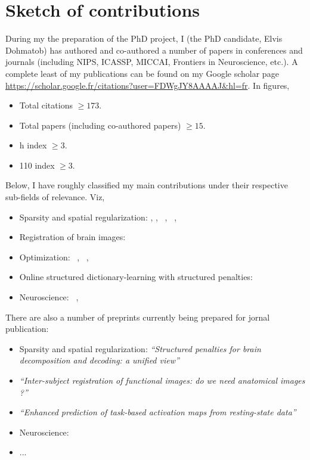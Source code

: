 \section{Sketch of contributions}
\label{sec:contrib}
During my the preparation of the PhD project, I (the PhD
candidate, Elvis Dohmatob) has authored and co-authored a number of papers in conferences and journals (including NIPS, ICASSP, MICCAI,
Frontiers in Neuroscience, etc.).
A complete least of my publications can be found on my Google scholar page \url{https://scholar.google.fr/citations?user=FDWgJY8AAAAJ&hl=fr}. In figures,
\begin{shaded}
\begin{itemize}
\item Total citations $\ge 173$.
  \item Total papers (including co-authored papers) $\ge 15$.
  \item h index $\ge 3$.
  \item 110 index $ \ge 3$.
  \end{itemize}
\end{shaded}  
Below, I  have roughly classified my main contributions under their respective sub-fields of relevance. Viz,
\begin{shaded}
\begin{itemize}
  \item{Sparsity and spatial regularization:}
     \citep{dohmatob2014benchmarking},  \citep{dohmatob2015speeding},
     ~\citep{abrahamregion},  ~\citep{eickenberg2015total},
     ~\citep{pelle2016multivariate}
  \item{Registration of brain images:}
    ~\citep{dohmatob2016epi2epi}
  \item{Optimization:}
     ~\citep{dohmatob2015local},  ~\citep{varoquaux2015faasta},  ~\citep{dohmatob2015simple}
  \item{Online structured dictionary-learning with structured penalties:}
     ~\citep{dohmatob2016}
  \item{Neuroscience:}
     ~\citep{rahim2015integrating},  ~\citep{thirion2014fmri}
\end{itemize}
\end{shaded}

There are also a number of preprints currently being prepared for jornal publication:

\begin{shaded}
\begin{itemize}
  \item{Sparsity and spatial regularization:}
     \textit{``Structured penalties for brain decomposition and decoding: a unified view''}
   \item \textit{``Inter-subject registration of functional images: do we need anatomical images ?''}
   \item \textit{``Enhanced prediction of task-based activation maps
     from resting-state data''}
 \item{Neuroscience:}
   \item ...
\end{itemize}
\end{shaded}


